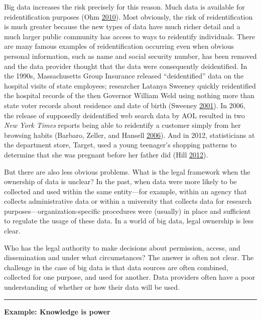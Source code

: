 \documentclass[]{krantz}
\begin{document}
Big data increases the risk precisely for this reason. Much data is
available for reidentification purposes (Ohm
\protect\hyperlink{ref-ohm2010broken}{2010}). Most obviously, the risk
of reidentification is much greater because the new types of data have
much richer detail and a much larger public community has access to ways
to reidentify individuals. There are many famous examples of
reidentification occurring even when obvious personal information, such
as name and social security number, has been removed and the data
provider thought that the data were consequently deidentified. In the
1990s, Massachusetts Group Insurance released ``deidentified'' data on
the hospital visits of state employees; researcher Latanya Sweeney
quickly reidentified the hospital records of the then Governor William
Weld using nothing more than state voter records about residence and
date of birth (Sweeney
\protect\hyperlink{ref-sweeney2001computational}{2001}). In 2006, the
release of supposedly deidentified web search data by AOL resulted in
two \emph{New York Times} reports being able to reidentify a customer
simply from her browsing habits (Barbaro, Zeller, and Hansell
\protect\hyperlink{ref-barbaro2006face}{2006}). And in 2012,
statisticians at the department store, Target, used a young teenager's
shopping patterns to determine that she was pregnant before her father
did (Hill \protect\hyperlink{ref-hill2012target}{2012}).

But there are also less obvious problems. What is the legal framework
when the ownership of data is unclear? In the past, when data were more
likely to be collected and used within the same entity---for example,
within an agency that collects administrative data or within a
university that collects data for research
purposes---organization-specific procedures were (usually) in place and
sufficient to regulate the usage of these data. In a world of big data,
legal ownership is less clear.

Who has the legal authority to make decisions about permission, access,
and dissemination and under what circumstances? The answer is often not
clear. The challenge in the case of big data is that data sources are
often combined, collected for one purpose, and used for another. Data
providers often have a poor understanding of whether or how their data
will be used.

\begin{center}\rule{0.5\linewidth}{\linethickness}\end{center}

\textbf{Example: Knowledge is power}
\end{document}
